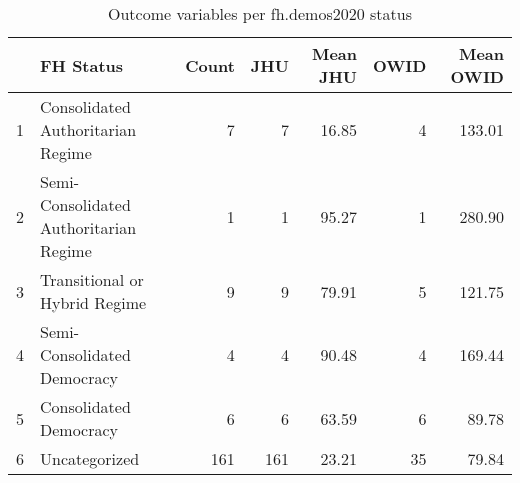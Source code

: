 \begin{table}[ht]
\centering
\caption{Outcome variables per fh.demos2020 status} 
\begingroup\footnotesize
\begin{tabular}{rlrrrrr}
  \hline
 & FH Status & Count & JHU & Mean JHU & OWID & Mean OWID \\ 
  \hline
1 & Consolidated Authoritarian Regime &   7 &   7 & 16.85 &   4 & 133.01 \\ 
  2 & Semi-Consolidated Authoritarian Regime &   1 &   1 & 95.27 &   1 & 280.90 \\ 
  3 & Transitional or Hybrid Regime &   9 &   9 & 79.91 &   5 & 121.75 \\ 
  4 & Semi-Consolidated Democracy &   4 &   4 & 90.48 &   4 & 169.44 \\ 
  5 & Consolidated Democracy &   6 &   6 & 63.59 &   6 & 89.78 \\ 
  6 & Uncategorized & 161 & 161 & 23.21 &  35 & 79.84 \\ 
   \hline
\end{tabular}
\endgroup
\end{table}
